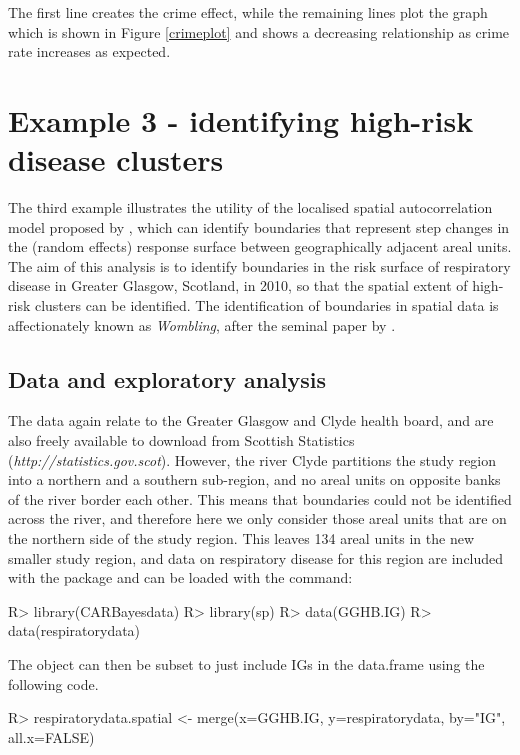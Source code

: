 \documentclass[article,shortnames,nojss]{jss}
\begin{document}
The first line creates the crime effect, while the remaining lines plot the graph which is shown in Figure \ref{crimeplot} and shows a decreasing relationship as crime rate increases as expected.


\section{Example 3 - identifying high-risk disease clusters}
The third example illustrates the utility of the localised spatial autocorrelation model proposed by \cite{lee2012}, which can identify boundaries that represent step changes in the (random effects) response surface between geographically adjacent areal units. The aim of this analysis is to identify boundaries in the risk surface of respiratory disease in Greater Glasgow, Scotland, in 2010, so that the spatial extent of high-risk clusters can be identified. The identification of boundaries in spatial data is affectionately known as \emph{Wombling}, after the seminal paper by \cite{womble1951}. 


\subsection{Data and exploratory analysis}
The data again relate to the Greater Glasgow and Clyde health board, and are also freely available to download from  Scottish Statistics (\emph{http://statistics.gov.scot}). However, the river Clyde partitions the study region into a northern and a southern sub-region, and no areal units on opposite banks of the river border each other. This means that boundaries could not be identified across the river, and therefore here we only consider those areal units that are on the northern side of the study region. This leaves 134 areal units in the new smaller study region, and data on respiratory disease for this region are included with the  package and can be loaded with the command:


\begin{Schunk}
\begin{Sinput}
R> library(CARBayesdata)
R> library(sp)
R> data(GGHB.IG)
R> data(respiratorydata)
\end{Sinput}
\end{Schunk}

The   object can then be subset to just include IGs in the  data.frame using the following code.

\begin{Schunk}
\begin{Sinput}
R> respiratorydata.spatial <- merge(x=GGHB.IG, y=respiratorydata, by="IG", all.x=FALSE)
\end{Sinput}
\end{Schunk}
\end{document}
